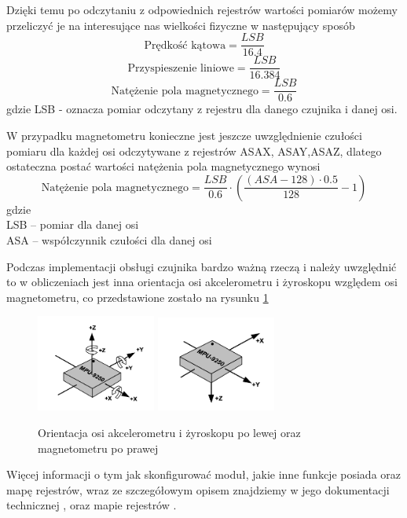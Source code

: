 Dzięki temu po odczytaniu z odpowiednich rejestrów wartości pomiarów możemy przeliczyć je na interesujące nas wielkości fizyczne w następujący sposób
$$
    \textrm{Prędkość kątowa} = \frac{LSB}{16.4}
$$
$$
    \textrm{Przyspieszenie liniowe} = \frac{LSB}{16.384}
$$
$$
    \textrm{Natężenie pola magnetycznego} = \frac{LSB}{0.6}
$$
gdzie LSB - oznacza pomiar odczytany z rejestru dla danego czujnika i danej osi.

W przypadku magnetometru konieczne jest jeszcze uwzględnienie czułości pomiaru dla każdej osi odczytywane z rejestrów ASAX, ASAY,ASAZ, dlatego ostateczna postać wartości natężenia pola magnetycznego wynosi
$$
    \textrm{Natężenie pola magnetycznego} = \frac{LSB}{0.6} \cdot \left(\frac{(ASA-128)\cdot 0.5}{128}-1\right)
$$
gdzie \\
LSB -- pomiar dla danej osi \\
ASA -- współczynnik czułości dla danej osi

Podczas implementacji obsługi czujnika bardzo ważną rzeczą i należy uwzględnić to w obliczeniach jest inna orientacja osi akcelerometru i żyroskopu względem osi magnetometru, co przedstawione zostało na rysunku \ref{Orientacja}

\begin{figure}[h!]
    \centering
    \includegraphics[width=0.35\textwidth]{Rysunki/Rozdzial05/AcceGyro_osie.png}
    \includegraphics[width=0.35\textwidth]{Rysunki/Rozdzial05/Mag_osie.png}
    \caption{Orientacja osi akcelerometru i żyroskopu po lewej oraz magnetometru po prawej }
    \label{Orientacja}
\end{figure}

Więcej informacji o tym jak skonfigurować moduł, jakie inne funkcje posiada oraz mapę rejestrów, wraz ze szczegółowym opisem znajdziemy w jego dokumentacji technicznej \cite{MPU9250datascheet}, oraz mapie rejestrów \cite{MPU9250registermap}. 

